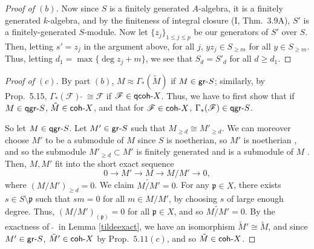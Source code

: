\documentclass[12pt,letterpaper]{article}
\theoremstyle{definition}
\theoremstyle{remark}
\numberwithin{equation}{section}
\numberwithin{figure}{problem}
\newcommand{\FF}{\mathscr{F}}
\newcommand{\gr}{\mathsf{gr}\mathchar`-}
\newcommand{\qgr}{\mathsf{qgr}\mathchar`-}
\newcommand{\qcoh}{\mathsf{qcoh}\mathchar`-}
\newcommand{\coh}{\mathsf{coh}\mathchar`-}
\begin{document}
\begin{proof}[Proof of $(b)$]
  \par Now since $S$ is a finitely generated $A$-algebra, it is a finitely generated $k$-algebra, and by the finiteness of integral closure (I, Thm.~3.9A), $S'$ is a finitely-generated $S$-module. Now let $\{z_j\}_{1 \le j \le p}$ be our generators of $S'$ over $S$. Then, letting $s' = z_j$ in the argument above, for all $j$, $yz_j \in S_{\ge m}$ for all $y \in S_{\ge m}$. Thus, letting $d_1 = \max\{\deg z_j + m\}$, we see that $S_d = S'_d$ for all $d \ge d_1$.
\end{proof}
\begin{proof}[Proof of $(c)$]
  By part $(b)$, $M \approx \Gamma_*(\tilde{M})$ if $M \in \gr S$; similarly, by Prop.~5.15, $\Gamma_*(\FF)\:\tilde{}\: \cong \FF$ if $\FF \in \qcoh X$. Thus, we have to first show that if $M \in \qgr S$, $\tilde{M} \in \coh X$, and that for $\FF \in \coh X$, $\Gamma_*(\FF) \in \qgr S$.
  \par So let $M \in \qgr S$. Let $M' \in \gr S$ such that $M_{\ge d} \cong M'_{\ge d}$. We can moreover choose $M'$ to be a submodule of $M$ since $S$ is noetherian, so $M'$ is noetherian \cite[Prop.~6.5]{AM69}, and so the submodule $M'_{\ge d} \subset M'$ is finitely generated and is a submodule of $M$ \cite[Prop.~6.2]{AM69}. Then, $M,M'$ fit into the short exact sequence
  \begin{equation*}
    0 \longrightarrow M' \longrightarrow M \longrightarrow M/M' \longrightarrow 0,
  \end{equation*}
  where $(M/M')_{\ge d} = 0$. We claim $\widetilde{M/M'} = 0$. For any $\mathfrak{p} \in X$, there exists $s \in S \setminus \mathfrak{p}$ such that $sm = 0$ for all $m \in M/M'$, by choosing $s$ of large enough degree. Thus, $(M/M')_{(\mathfrak{p})} = 0$ for all $\mathfrak{p} \in X$, and so $\widetilde{M/M'} = 0$. By the exactness of $\:\tilde{}\:$ in Lemma \ref{tildeexact}, we have an isomorphism $\tilde{M}' \cong \tilde{M}$, and since $M' \in \gr S$, $\tilde{M}' \in \coh X$ by Prop.~$5.11(c)$, and so $\tilde{M} \in \coh X$.

\end{proof}
\end{document}
